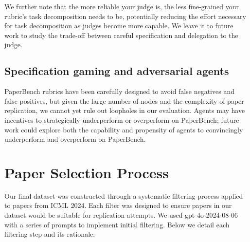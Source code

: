 \documentclass{article}
\theoremstyle{plain}
\theoremstyle{definition}
\theoremstyle{remark}
\begin{document}
We further note that the more reliable your judge is, the less fine-grained your rubric's task decomposition needs to be, potentially reducing the effort necessary for task decomposition as judges become more capable. We leave it to future work to study the trade-off between careful specification and delegation to the judge.

\subsection{Specification gaming and adversarial agents}
PaperBench rubrics have been carefully designed to avoid false negatives and false positives, but given the large number of nodes and the complexity of paper replication, we cannot yet rule out loopholes in our evaluation. Agents may have incentives to strategically underperform \citep{van2024ai} or overperform \citep{deepmind2024, pan2022effectsrewardmisspecificationmapping} on PaperBench; future work could explore both the capability and propensity of agents to convincingly underperform and overperform on PaperBench.

\section{Paper Selection Process}
\label{app:paper-selection}

Our final dataset was constructed through a systematic filtering process applied to papers from ICML 2024. Each filter was designed to ensure papers in our dataset would be suitable for replication attempts. We used gpt-4o-2024-08-06 with a series of prompts to implement initial filtering. Below we detail each filtering step and its rationale:
\end{document}
